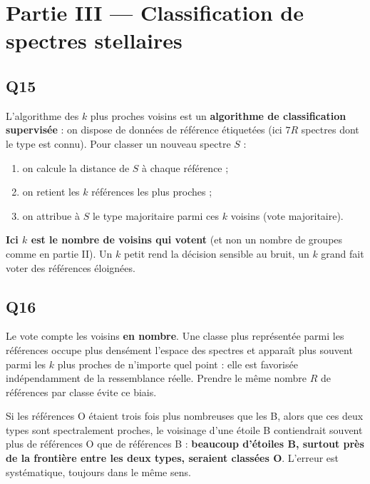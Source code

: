 \documentclass[11pt,a4paper]{article}
\providecommand{\tightlist}{\setlength{\itemsep}{0pt}\setlength{\parskip}{0pt}}
\begin{document}
\hypertarget{partie-iii-classification-de-spectres-stellaires}{%
\section{Partie III --- Classification de spectres stellaires}\label{partie-iii-classification-de-spectres-stellaires}}

\hypertarget{q15}{%
\subsection{Q15}\label{q15}}

L'algorithme des \(k\) plus proches voisins est un \textbf{algorithme de classification supervisée} : on dispose de données de référence étiquetées (ici \(7R\) spectres dont le type est connu). Pour classer un nouveau spectre \(S\) :

\begin{enumerate}
\def\labelenumi{\arabic{enumi}.}
\tightlist
\item
  on calcule la distance de \(S\) à chaque référence ;
\item
  on retient les \(k\) références les plus proches ;
\item
  on attribue à \(S\) le type majoritaire parmi ces \(k\) voisins (vote majoritaire).
\end{enumerate}

\textbf{Ici \(k\) est le nombre de voisins qui votent} (et non un nombre de groupes comme en partie II). Un \(k\) petit rend la décision sensible au bruit, un \(k\) grand fait voter des références éloignées.

\hypertarget{q16}{%
\subsection{Q16}\label{q16}}

Le vote compte les voisins \textbf{en nombre}. Une classe plus représentée parmi les références occupe plus densément l'espace des spectres et apparaît plus souvent parmi les \(k\) plus proches de n'importe quel point : elle est favorisée indépendamment de la ressemblance réelle. Prendre le même nombre \(R\) de références par classe évite ce biais.

Si les références O étaient trois fois plus nombreuses que les B, alors que ces deux types sont spectralement proches, le voisinage d'une étoile B contiendrait souvent plus de références O que de références B : \textbf{beaucoup d'étoiles B, surtout près de la frontière entre les deux types, seraient classées O}. L'erreur est systématique, toujours dans le même sens.
\end{document}
